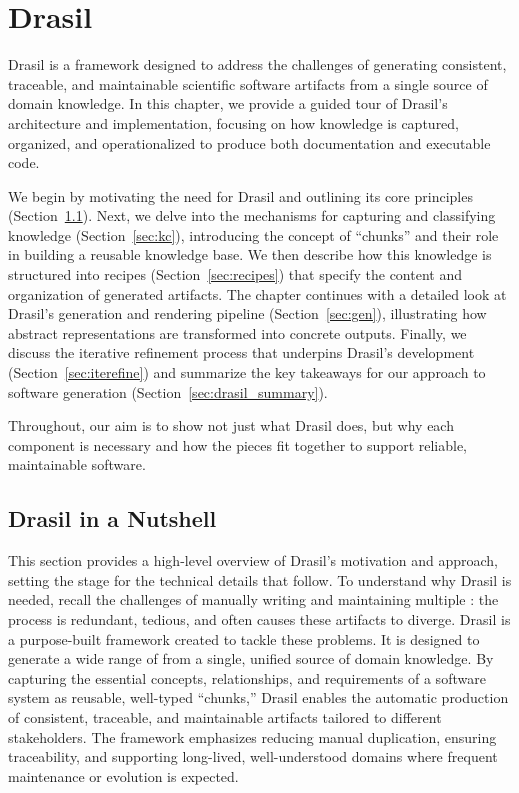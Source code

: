 \chapter{Drasil}
\label{c:drasil}

Drasil is a framework designed to address the challenges of generating 
consistent, traceable, and maintainable scientific software artifacts from a 
single source of domain knowledge. In this chapter, we provide a guided tour of 
Drasil's architecture and implementation, focusing on how knowledge is 
captured, organized, and operationalized to produce both documentation and 
executable code. 

We begin by motivating the need for Drasil and outlining its core principles
(Section~\ref{sec:nutshell}). Next, we delve into the mechanisms for capturing
and classifying knowledge (Section~\ref{sec:kc}), introducing the concept of
``chunks'' and their role in building a reusable knowledge base. We then
describe how this knowledge is structured into recipes
(Section~\ref{sec:recipes}) that specify the content and organization of
generated artifacts. The chapter continues with a detailed look at Drasil's
generation and rendering pipeline (Section~\ref{sec:gen}), illustrating how
abstract representations are transformed into concrete outputs. Finally, we
discuss the iterative refinement process that underpins Drasil's development
(Section~\ref{sec:iterefine}) and summarize the key takeaways for our approach
to software generation (Section~\ref{sec:drasil_summary}).

Throughout, our aim is to show not just what Drasil does, but why each 
component is necessary and how the pieces fit together to support reliable, 
maintainable software.
      
\section{Drasil in a Nutshell}
\label{sec:nutshell}

This section provides a high-level overview of Drasil's motivation and 
approach, setting the stage for the technical details that follow. To 
understand why Drasil is needed, recall the challenges of manually writing 
and maintaining multiple \sfs{}: the process is redundant, tedious, and
often causes these artifacts to diverge. Drasil is a purpose-built framework created to
tackle these problems. It is designed to generate a wide range of \sfs{} from a 
single, unified source of domain knowledge. By capturing the essential 
concepts, relationships, and requirements of a software system as reusable, 
well-typed ``chunks,'' Drasil enables the automatic production of consistent, 
traceable, and maintainable artifacts tailored to different stakeholders. The 
framework emphasizes reducing manual duplication, ensuring traceability, and 
supporting long-lived, well-understood domains where frequent maintenance or 
evolution is expected. 

